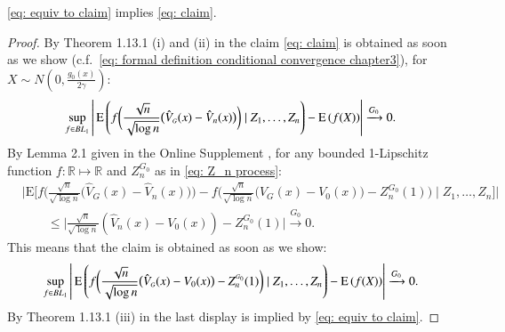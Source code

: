\begin{lemma}\label{eq: lemma equiv to claim}
	\eqref{eq: equiv to claim} implies \eqref{eq: claim}. 
\end{lemma}
	\begin{proof}
	By Theorem 1.13.1 (i) and (ii) in \cite{5} the claim \eqref{eq: claim} is obtained as soon as we show (c.f.\ \eqref{eq: formal definition conditional convergence chapter3}), for $X \sim N\left(0, \frac{g_0(x)}{2 \gamma}\right)$:
	\begin{align*}
		\sup _{f \in B L_1}\left| \, \mathrm{E}\left(f\bigg(\frac{\sqrt{n}}{\sqrt{\log n}}\big(\hat{V}_{\scriptscriptstyle{G}}(x)-\hat{V}_n(x)\big)\bigg) \mid Z_1,\ldots,Z_n \right)- \mathrm{E} \left(f(X) \right) \right| \xrightarrow{G_0} 0.	
	\end{align*}
	By Lemma 2.1 given in the Online Supplement \cite{64}, for any bounded 1-Lipschitz function $f : \mathbb{R} \mapsto \mathbb{R}$ and $Z^{\scriptscriptstyle{G_0}}_n$ as in \eqref{eq: Z_n process}:
	\begin{align*}
		&\bigg|\mathrm{E} \bigg[f\bigg(\frac{\sqrt{n}}{\sqrt{\log n}}\big(\hat{V}_{\scriptscriptstyle{G}}(x)-\hat{V}_n(x)\big)\bigg) - f\bigg(\frac{\sqrt{n}}{\sqrt{\log n}}\big(\hat{V}_{\scriptscriptstyle{G}}(x)-V_0(x)\big)-Z^{\scriptscriptstyle{G_0}}_n(1)\bigg)\mid  Z_1, \ldots, Z_n  \bigg] \bigg| \\
		&   \quad \quad \leq \bigg| \frac{\sqrt{n}}{\sqrt{\log n}}\left(\hat{V}_n(x)-V_0(x)\right)-Z^{\scriptscriptstyle{G_0}}_n(1) \bigg| \xrightarrow{G_0} 0.
	\end{align*} 
	This means that the claim is obtained as soon as we show:
	\begin{align*}
		\sup _{f \in B L_1}\left| \, \mathrm{E}\left(f\bigg(\frac{\sqrt{n}}{\sqrt{\log n}}\big(\hat{V}_{\scriptscriptstyle{G}}(x)-V_0(x)\big)-Z^{\scriptscriptstyle{G_0}}_n(1)\bigg) \mid Z_1,\ldots,Z_n \right)- \mathrm{E} \left(f(X) \right) \right| \xrightarrow{G_0} 0.	
	\end{align*}
	By Theorem 1.13.1 (iii) in \cite{5} the last display is implied by \eqref{eq: equiv to claim}.
	\end{proof}
	
